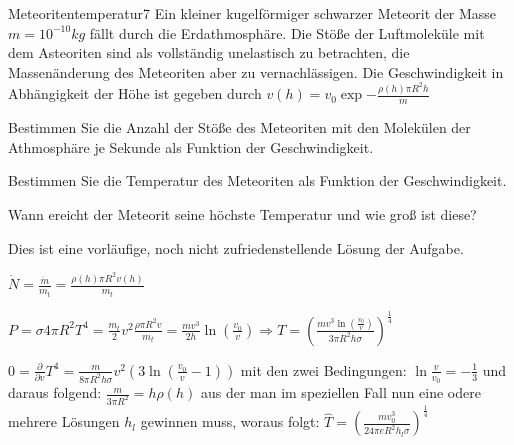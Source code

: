 \begin{problem}{Meteoritentemperatur}{7}
Ein kleiner kugelförmiger schwarzer Meteorit der Masse $m=10^{-10}\unit{kg}$ fällt durch die Erdathmosphäre. Die Stöße der Luftmoleküle mit dem Asteoriten sind als vollständig unelastisch zu betrachten, die Massenänderung des Meteoriten aber zu vernachlässigen. Die Geschwindigkeit in Abhängigkeit der Höhe ist gegeben durch $v(h)=v_0\exp{-\frac{\rho(h)\pi R^2h}{m}}$
 \begin{abcenum}
  \item Bestimmen Sie die Anzahl der Stöße des Meteoriten mit den Molekülen der Athmosphäre je Sekunde als Funktion der Geschwindigkeit.
  \item Bestimmen Sie die Temperatur des Meteoriten als Funktion der Geschwindigkeit.
  \item Wann ereicht der Meteorit seine höchste Temperatur und wie groß ist diese?
 \end{abcenum}
\begin{solution}
Dies ist eine vorläufige, noch nicht zufriedenstellende Lösung der Aufgabe.
\begin{abcenum}
\item $\dot{N}=\frac{\dot{m}}{m_t}=\frac{\rho(h) \pi R^2 v(h)}{m_t}$
\item $P=\sigma 4\pi R^2 T^4=\frac{m_t}2v^2\frac{\rho \pi R^2 v}{m_t}=\frac{mv^3}{2h}\ln{\left(\frac{v_0}{v}\right)} \Rightarrow T=\left(\frac{mv^3\ln{\left(\frac{v_0}{v}\right)}}{3\pi R^2h\sigma}\right)^{\frac 14}$
\item  $0=\frac {\partial}{\partial v}T^4=\frac{m}{8\pi R^2h\sigma}v^2\left(3\ln\left(\frac{v_0}{v}-1\right)\right)$ mit den zwei Bedingungen: $\ln\frac{v}{v_0}=-\frac 13$ und daraus folgend: $\frac{m}{3\pi R^2}=h\rho(h)$ aus der man im speziellen Fall nun eine odere mehrere Lösungen $h_l$ gewinnen muss, woraus folgt: $\hat{T}=\left(\frac{mv_0^3}{24\pi e R^2h_l\sigma}\right)^{\frac 14}$
\end{abcenum}
\end{solution}
\end{problem}

